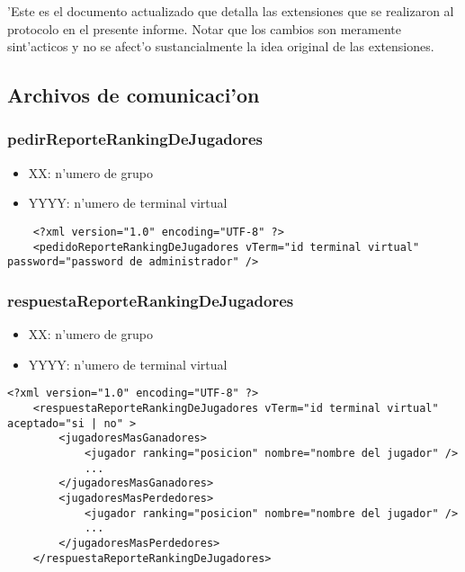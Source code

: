 'Este es el documento actualizado que detalla las extensiones que se realizaron al protocolo en el presente informe. Notar que los cambios son meramente sint'acticos y no se afect'o sustancialmente la idea original de las extensiones.

\subsection{Archivos de comunicaci'on}

\subsubsection{pedirReporteRankingDeJugadores}
 
\begin{itemize}
    \item{XX: n'umero de grupo}
    \item{YYYY: n'umero de terminal virtual}
\end{itemize}

\begin{verbatim}
    <?xml version="1.0" encoding="UTF-8" ?>
    <pedidoReporteRankingDeJugadores vTerm="id terminal virtual" password="password de administrador" />
\end{verbatim}


\subsubsection{respuestaReporteRankingDeJugadores}
 
\begin{itemize}
    \item{XX: n'umero de grupo}
    \item{YYYY: n'umero de terminal virtual}
\end{itemize}

\begin{verbatim}
<?xml version="1.0" encoding="UTF-8" ?>
    <respuestaReporteRankingDeJugadores vTerm="id terminal virtual" aceptado="si | no" >
        <jugadoresMasGanadores>
            <jugador ranking="posicion" nombre="nombre del jugador" />
            ...
        </jugadoresMasGanadores>
        <jugadoresMasPerdedores>
            <jugador ranking="posicion" nombre="nombre del jugador" />
            ...
        </jugadoresMasPerdedores>
    </respuestaReporteRankingDeJugadores>
\end{verbatim}


